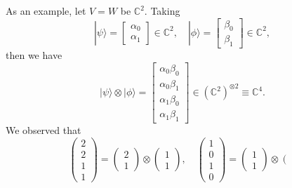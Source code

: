 \begin{example}
    As an example, let $V = W$ be $\mathbb{C}^2$. Taking
    \begin{equation}
    |\psi\rangle=\left[\begin{array}{l}
    \alpha_0 \\
    \alpha_1
    \end{array}\right] \in \mathbb{C}^2, \quad
    |\phi\rangle=\left[\begin{array}{l}
    \beta_0 \\
    \beta_1
    \end{array}\right] \in \mathbb{C}^2,
    \end{equation}
    then we have
    \begin{equation}\label{eq_tensor}
        |\psi\rangle \otimes|\phi\rangle=\left[\begin{array}{l}
        \alpha_0\beta_0 \\
        \alpha_0\beta_1 \\
        \alpha_1\beta_0 \\
        \alpha_1\beta_1
        \end{array}\right] \in\left(\mathbb{C}^2\right)^{\otimes 2} \equiv \mathbb{C}^4.
    \end{equation}
    We observed that
    \begin{equation}
    \left(\begin{array}{l}
    2 \\
    2 \\
    1 \\
    1
    \end{array}\right)=\left(\begin{array}{l}
    2 \\
    1
    \end{array}\right) \otimes\left(\begin{array}{l}
    1 \\
    1
    \end{array}\right)
    , \quad
    \left(\begin{array}{l}
    1 \\
    0 \\
    1 \\
    0
    \end{array}\right)=\left(\begin{array}{l}
    1 \\
    1
    \end{array}\right) \otimes\left(\begin{array}{l}

\end{array}
\end{equation}
\end{example}
